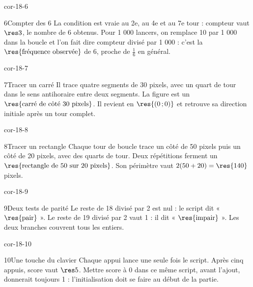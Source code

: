 \begin{blocLivre}{cor-18-6}\begin{corrige}{6}{Compter des 6}
La condition est vraie au 2e, au 4e et au 7e tour : compteur vaut $\res3$, le nombre de 6 obtenus. Pour 1 000 lancers, on remplace 10 par 1 000 dans la boucle et l’on fait dire compteur divisé par 1 000 : c’est la $\res{\text{fréquence observée}}$ de 6, proche de $\frac16$ en général.
\label{fig-cor-18-6}
\end{corrige}\end{blocLivre}
\begin{blocLivre}{cor-18-7}\begin{corrige}{7}{Tracer un carré}
Il trace quatre segments de 30 pixels, avec un quart de tour dans le sens antihoraire entre deux segments. La figure est un $\res{\text{carré de côté 30 pixels}}$. Il revient en $\res{(0\,;0)}$ et retrouve sa direction initiale après un tour complet.
\label{fig-cor-18-7}
\end{corrige}\end{blocLivre}
\begin{blocLivre}{cor-18-8}\begin{corrige}{8}{Tracer un rectangle}
Chaque tour de boucle trace un côté de 50 pixels puis un côté de 20 pixels, avec des quarts de tour. Deux répétitions ferment un $\res{\text{rectangle de 50 sur 20 pixels}}$. Son périmètre vaut $2(50+20)=\res{140}$ pixels.
\label{fig-cor-18-8}
\end{corrige}\end{blocLivre}
\begin{blocLivre}{cor-18-9}\begin{corrige}{9}{Deux tests de parité}
Le reste de 18 divisé par 2 est nul : le script dit « $\res{\text{pair}}$ ». Le reste de 19 divisé par 2 vaut 1 : il dit « $\res{\text{impair}}$ ». Les deux branches couvrent tous les entiers.
\label{fig-cor-18-9}
\end{corrige}\end{blocLivre}
\begin{blocLivre}{cor-18-10}\begin{corrige}{10}{Une touche du clavier}
Chaque appui lance une seule fois le script. Après cinq appuis, score vaut $\res5$. Mettre score à 0 dans ce même script, avant l’ajout, donnerait toujours 1 : l’initialisation doit se faire au début de la partie.
\label{fig-cor-18-10}
\end{corrige}\end{blocLivre}
